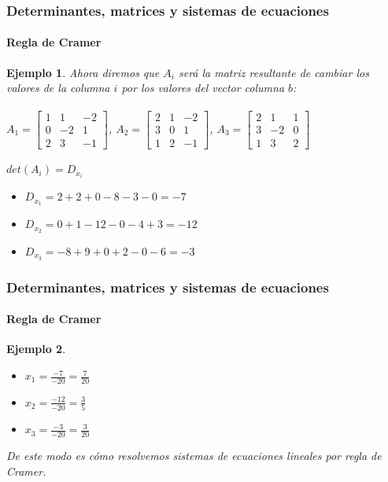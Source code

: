\documentclass[11pt]{beamer}
\newtheorem{ejem}{Ejemplo}
\begin{document}
\begin{frame}
\frametitle{Determinantes, matrices y sistemas de ecuaciones}
\framesubtitle{Regla de Cramer}
\begin{ejem}
Ahora diremos que $A_i$ será la matriz resultante de cambiar los valores de la columna $i$ por los valores del vector columna $b$: \\ \hspace{0cm} \\
$\displaystyle A_1 = {\begin{bmatrix}1&1&-2\\0&-2&1\\2&3&-1\end{bmatrix}}$,
$\displaystyle A_2 = {\begin{bmatrix}2&1&-2\\3&0&1\\1&2&-1\end{bmatrix}}$,
$\displaystyle A_3 = {\begin{bmatrix}2&1&1\\3&-2&0\\1&3&2\end{bmatrix}}$\\ \hspace{0cm} \\
$det(A_i) = D_{x_i}$ 
\begin{itemize}
\item $D_{x_1} = 2+2+0-8-3-0 = -7$
\item $D_{x_2} = 0+1-12-0-4+3 = -12$
\item $D_{x_3} = -8+9+0+2-0-6 = -3$
\end{itemize}
\end{ejem}
\end{frame}

\begin{frame}
\frametitle{Determinantes, matrices y sistemas de ecuaciones}
\framesubtitle{Regla de Cramer}
\begin{ejem}
\begin{itemize}
\item $x_1 = \frac{-7}{-20} = \frac{7}{20}$
\item $x_2 = \frac{-12}{-20} = \frac{3}{5}$
\item $x_3 = \frac{-3}{-20} = \frac{3}{20}$
\end{itemize}
De este modo es cómo resolvemos sistemas de ecuaciones lineales por regla de Cramer.
\end{ejem}
\end{frame}
\end{document}
